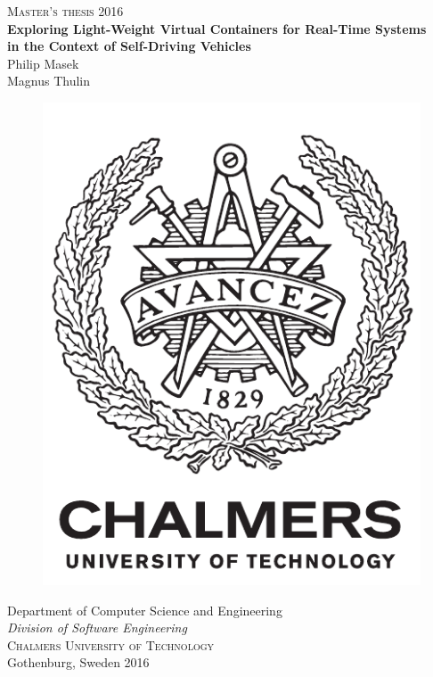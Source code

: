 \newpage
\thispagestyle{empty}
\begin{center}
	\textsc{\large Master's thesis 2016}\\[4cm]		%
	\textbf{\Large 	Exploring Light-Weight Virtual Containers for Real-Time Systems \\[0cm]
					in the Context of Self-Driving Vehicles} \\[1cm]

	{\Large Philip Masek}\\[0.4cm]
	{\Large Magnus Thulin}
	
	\vfill	
	\begin{figure}[H]
	\centering
	\includegraphics[width=0.2\pdfpagewidth]{figure/auxiliary/logo_eng.pdf} \\	
	\end{figure}	\vspace{5mm}	
	
	Department of Computer Science and Engineering \\
	\emph{Division of Software Engineering}\\
	\textsc{Chalmers University of Technology} \\
	Gothenburg, Sweden 2016 \\
\end{center}


